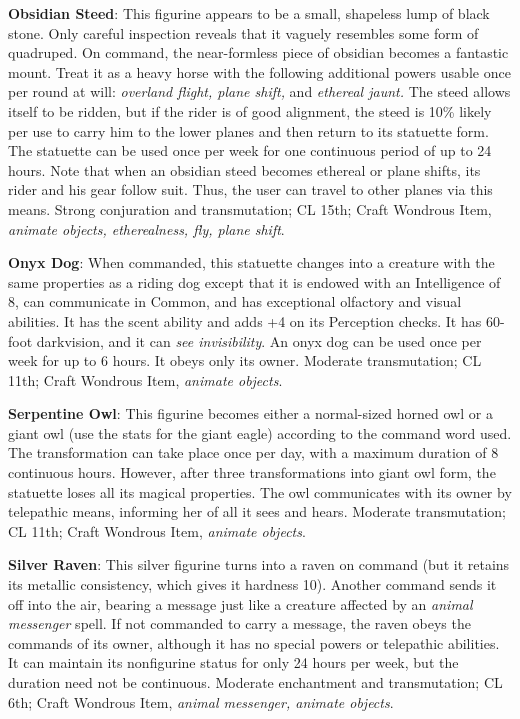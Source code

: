 \textbf{Obsidian Steed}: This figurine appears to be a small, shapeless lump of black stone. Only careful inspection reveals that it vaguely resembles some form of quadruped. On command, the near-formless piece of obsidian becomes a fantastic mount. Treat it as a heavy horse with the following additional powers usable once per round at will: \textit{overland flight, plane shift,} and \textit{ethereal jaunt.} The steed allows itself to be ridden, but if the rider is of good alignment, the steed is 10\% likely per use to carry him to the lower planes and then return to its statuette form. The statuette can be used once per week for one continuous period of up to 24 hours. Note that when an obsidian steed becomes ethereal or plane shifts, its rider and his gear follow suit. Thus, the user can travel to other planes via this means. Strong conjuration and transmutation; CL 15th; Craft Wondrous Item,\textit{ animate objects, etherealness, fly, plane shift}.
				
\textbf{Onyx Dog}: When commanded, this statuette changes into a creature with the same properties as a riding dog except that it is endowed with an Intelligence of 8, can communicate in Common, and has exceptional olfactory and visual abilities. It has the scent ability and adds +4 on its Perception checks. It has 60-foot darkvision, and it can \textit{see invisibility}. An onyx dog can be used once per week for up to 6 hours. It obeys only its owner. Moderate transmutation; CL 11th; Craft Wondrous Item,\textit{ animate objects}.
				
\textbf{Serpentine Owl}: This figurine becomes either a normal-sized horned owl or a giant owl (use the stats for the giant eagle) according to the command word used. The transformation can take place once per day, with a maximum duration of 8 continuous hours. However, after three transformations into giant owl form, the statuette loses all its magical properties. The owl communicates with its owner by telepathic means, informing her of all it sees and hears. Moderate transmutation; CL 11th; Craft Wondrous Item,\textit{ animate objects}.
				
\textbf{Silver Raven}: This silver figurine turns into a raven on command (but it retains its metallic consistency, which gives it hardness 10). Another command sends it off into the air, bearing a message just like a creature affected by an \textit{animal messenger} spell. If not commanded to carry a message, the raven obeys the commands of its owner, although it has no special powers or telepathic abilities. It can maintain its nonfigurine status for only 24 hours per week, but the duration need not be continuous. Moderate enchantment and transmutation; CL 6th; Craft Wondrous Item, \textit{animal messenger, animate objects}.
				
